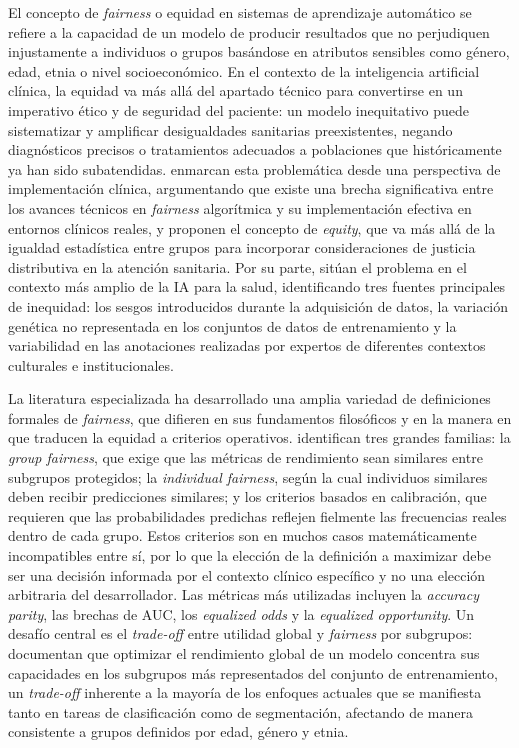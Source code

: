 El concepto de \textit{fairness} o equidad en sistemas de aprendizaje automático se refiere a la capacidad de un modelo de producir resultados que no perjudiquen injustamente a individuos o grupos basándose en atributos sensibles como género, edad, etnia o nivel socioeconómico. En el contexto de la inteligencia artificial clínica, la equidad va más allá del apartado técnico para convertirse en un imperativo ético y de seguridad del paciente: un modelo inequitativo puede sistematizar y amplificar desigualdades sanitarias preexistentes, negando diagnósticos precisos o tratamientos adecuados a poblaciones que históricamente ya han sido subatendidas. \textcite{liu2023translational} enmarcan esta problemática desde una perspectiva de implementación clínica, argumentando que existe una brecha significativa entre los avances técnicos en \textit{fairness} algorítmica y su implementación efectiva en entornos clínicos reales, y proponen el concepto de \textit{equity}, que va más allá de la igualdad estadística entre grupos para incorporar consideraciones de justicia distributiva en la atención sanitaria. Por su parte, \textcite{williamson2023} sitúan el problema en el contexto más amplio de la IA para la salud, identificando tres fuentes principales de inequidad: los sesgos introducidos durante la adquisición de datos, la variación genética no representada en los conjuntos de datos de entrenamiento y la variabilidad en las anotaciones realizadas por expertos de diferentes contextos culturales e institucionales.

La literatura especializada ha desarrollado una amplia variedad de definiciones formales de \textit{fairness}, que difieren en sus fundamentos filosóficos y en la manera en que traducen la equidad a criterios operativos. \textcite{gao2024} identifican tres grandes familias: la \textit{group fairness}, que exige que las métricas de rendimiento sean similares entre subgrupos protegidos; la \textit{individual fairness}, según la cual individuos similares deben recibir predicciones similares; y los criterios basados en calibración, que requieren que las probabilidades predichas reflejen fielmente las frecuencias reales dentro de cada grupo. Estos criterios son en muchos casos matemáticamente incompatibles entre sí, por lo que la elección de la definición a maximizar debe ser una decisión informada por el contexto clínico específico y no una elección arbitraria del desarrollador. Las métricas más utilizadas incluyen la \textit{accuracy parity}, las brechas de AUC, los \textit{equalized odds} y la \textit{equalized opportunity}. Un desafío central es el \textit{trade-off} entre utilidad global y \textit{fairness} por subgrupos: \textcite{kashif2025} documentan que optimizar el rendimiento global de un modelo concentra sus capacidades en los subgrupos más representados del conjunto de entrenamiento, un \textit{trade-off} inherente a la mayoría de los enfoques actuales que se manifiesta tanto en tareas de clasificación como de segmentación, afectando de manera consistente a grupos definidos por edad, género y etnia.

